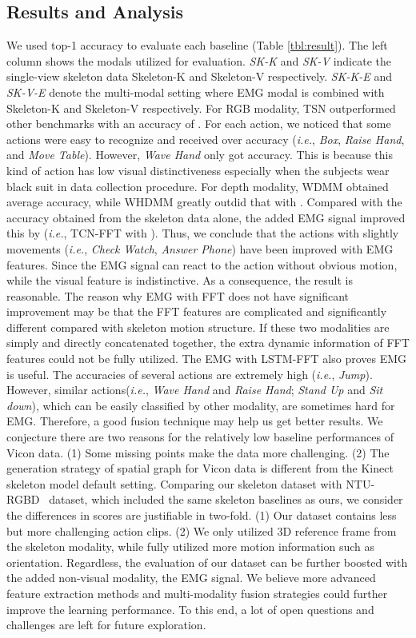 \documentclass[a4paper, 10pt, conference]{ieeeconf}      \usepackage{FG2020}
\newcommand*\ie{\textit{i.e.}}
\begin{document}
\subsection{Results and Analysis}
We used top-1 accuracy to evaluate each baseline (Table \ref{tbl:result}). The left column shows the modals utilized for evaluation. \textit{SK-K} and \textit{SK-V} indicate the single-view skeleton data Skeleton-K and Skeleton-V respectively. \textit{SK-K-E} and \textit{SK-V-E} denote the multi-modal setting where EMG modal is combined with Skeleton-K and Skeleton-V respectively. For RGB modality, TSN outperformed other benchmarks with an accuracy of . For each action, we noticed that some actions were easy to recognize and received over  accuracy (\ie, \textit{Box}, \textit{Raise Hand}, and \textit{Move Table}). However, \textit{Wave Hand} only got  accuracy. This is because this kind of action has low visual distinctiveness especially when the subjects wear black suit in data collection procedure. For depth modality, WDMM obtained  average accuracy, while WHDMM greatly outdid that with . Compared with the  accuracy obtained from the skeleton data alone, the added EMG signal improved this by  (\ie, TCN-FFT with ). Thus, we conclude that the actions with slightly movements (\ie, \textit{Check Watch}, \textit{Answer Phone}) have been improved with EMG features. Since the EMG signal can react to the action without obvious motion, while the visual feature is indistinctive. As a consequence, the result is reasonable. The reason why EMG with FFT does not have significant improvement may be that the FFT features are complicated and significantly different compared with skeleton motion structure. If these two modalities are simply and directly concatenated together, the extra dynamic information of FFT features could not be fully utilized. The EMG with LSTM-FFT also proves EMG is useful. The accuracies of several actions are extremely high (\ie, \textit{Jump}). However, similar actions(\ie, \textit{Wave Hand} and \textit{Raise Hand}; \textit{Stand Up} and \textit{Sit down}), which can be easily classified by other modality, are sometimes hard for EMG. Therefore, a good fusion technique may help us get better results. We conjecture there are two reasons for the relatively low baseline performances of Vicon data. (1) Some missing points make the data more challenging. (2) The generation strategy of spatial graph for Vicon data is different from the Kinect skeleton model default setting. Comparing our skeleton dataset with NTU-RGBD~\cite{SK_data_UTN} dataset, which included the same skeleton baselines as ours, we consider the differences in scores are justifiable in two-fold. (1) Our dataset contains less but more challenging action clips. (2) We only utilized 3D reference frame from the skeleton modality, while \cite{SK_data_UTN} fully utilized more motion information such as orientation. Regardless, the evaluation of our dataset can be further boosted with the added non-visual modality, the EMG signal. We believe more advanced feature extraction methods and multi-modality fusion strategies could further improve the learning performance. To this end, a lot of open questions and challenges are left for future exploration.
\end{document}

